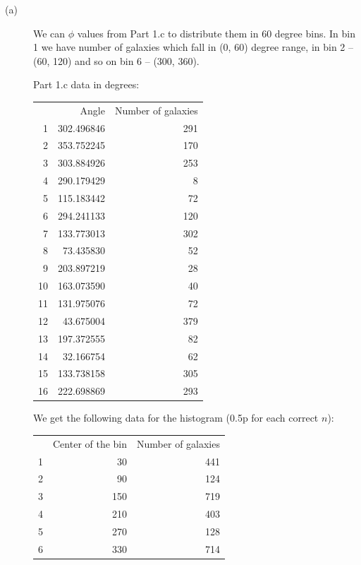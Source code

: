\begin{description}
\item[(a)] We can $\phi$ values from Part 1.c to distribute them in 60
  degree bins.
  In bin 1 we have number of galaxies which fall in (0, 60) degree
  range, in bin 2 -- (60, 120) and so on bin 6 -- (300, 360).

  Part 1.c data in degrees:

  \begin{center}
  \begin{tabular}{rrr}
  & Angle & Number of galaxies\\
  1 & 302.496846 & 291\\
  2 & 353.752245 & 170\\
  3 & 303.884926 & 253\\
  4 & 290.179429 & 8\\
  5 & 115.183442 & 72\\
  6 & 294.241133 & 120\\
  7 & 133.773013 & 302\\
  8 & 73.435830 & 52\\
  9 & 203.897219 & 28\\
  10 & 163.073590 & 40\\
  11 & 131.975076 & 72\\
  12 & 43.675004 & 379\\
  13 & 197.372555 & 82\\
  14 & 32.166754 & 62\\
  15 & 133.738158 & 305\\
  16 & 222.698869 & 293
  \end{tabular}
  \end{center}

  We get the following data for the histogram (0.5p for each correct
  $n$):

  \begin{center}
  \begin{tabular}{rrr}
  & Center of the bin & Number of galaxies\\
  1 & 30 & 441\\
  2 & 90 & 124\\
  3 & 150 & 719\\
  4 & 210 & 403\\
  5 & 270 & 128\\
  6 & 330 & 714
  \end{tabular}
  \end{center}


\end{description}
